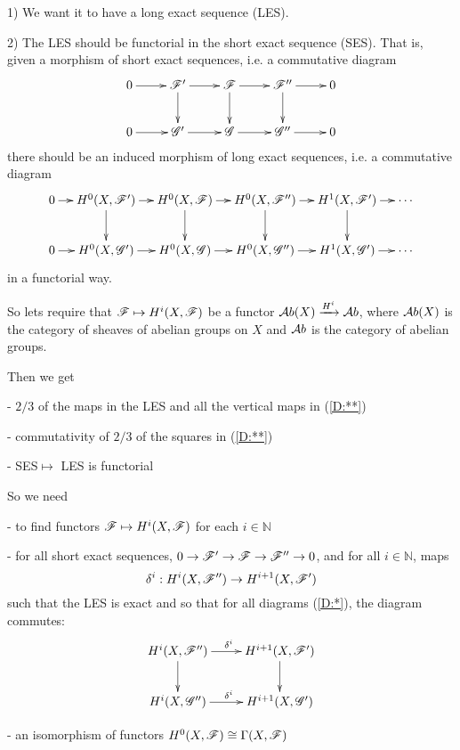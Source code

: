     \begin{list}{}{}
    \item 1) We want it to have a long exact sequence (LES).
    \item 2) The LES should be functorial in the short exact
    sequence (SES).  That is, given a morphism of short exact
    sequences, i.e. a commutative diagram
    \begin{equation}\label{D:*}\xymatrix{
        0\ar[r] & \F' \ar[r] \ar[d] & \F \ar[r] \ar[d] & \F''
        \ar[r] \ar[d] & 0\\
        0\ar[r] & \G' \ar[r]& \G \ar[r] & \G''
        \ar[r] & 0\\
    }\end{equation}
    there should be an induced morphism of long exact sequences, i.e. a
    commutative diagram
    \begin{equation}\label{D:**}\xymatrix@C=4mm{
        0\ar[r] & H^0(X,\F') \ar[r] \ar[d] & H^0(X,\F) \ar[r] \ar[d] & H^0(X,\F'')
        \ar[r] \ar[d] & H^1(X,\F')\ar[r]\ar[d] & \cdots \\
        0\ar[r] & H^0(X,\G') \ar[r] & H^0(X,\G) \ar[r]& H^0(X,\G'')
        \ar[r] & H^1(X,\G')\ar[r] & \cdots \\
    }\end{equation}
    in a functorial way.
    \end{list}
So lets require that $\mathscr{F}\mapsto H^i(X,\mathscr{F})$ be a functor
$\mathcal{A}b(X)\xrightarrow{H^i}\mathcal{A}b$, where $\mathcal{A}b(X)$ is the category of
sheaves of abelian groups on $X$ and $\mathcal{A}b$ is the category of
abelian groups.

Then we get
    \begin{list}{}{}
    \item[-] $2/3$ of the maps in the LES and all the vertical maps
    in (\ref{D:**})
    \item[-] commutativity of $2/3$ of the squares in (\ref{D:**})
    \item[-] SES$\mapsto$ LES is functorial
    \end{list}
So we need
    \begin{list}{}{}
    \item[-]to find functors $\mathscr{F}\mapsto H^i(X,\mathscr{F})$ for each $i\in
    \mathbb{N}$
    \item[-] for all short exact sequences, $0\to \mathscr{F}' \to \mathscr{F} \to \mathscr{F}''\to
    0$, and for all $i\in \mathbb{N}$, maps
    \[
        \delta^i:H^i(X,\mathscr{F}'')\to H^{i+1}(X,\mathscr{F}')
    \]
    such that the LES is exact and so that for all diagrams
    (\ref{D:*}), the diagram commutes:
    \[\xymatrix{
    H^i(X,\F'')\ar[r]^{\delta^i}\ar[d] & H^{i+1}(X,\F')\ar[d] \\
    H^i(X,\G'')\ar[r]^{\delta^i} & H^{i+1}(X,\G') \\
    }\]

    \item - an isomorphism of functors $H^0(X,\mathscr{F})\cong \Gamma(X,\mathscr{F})$
    \end{list}

